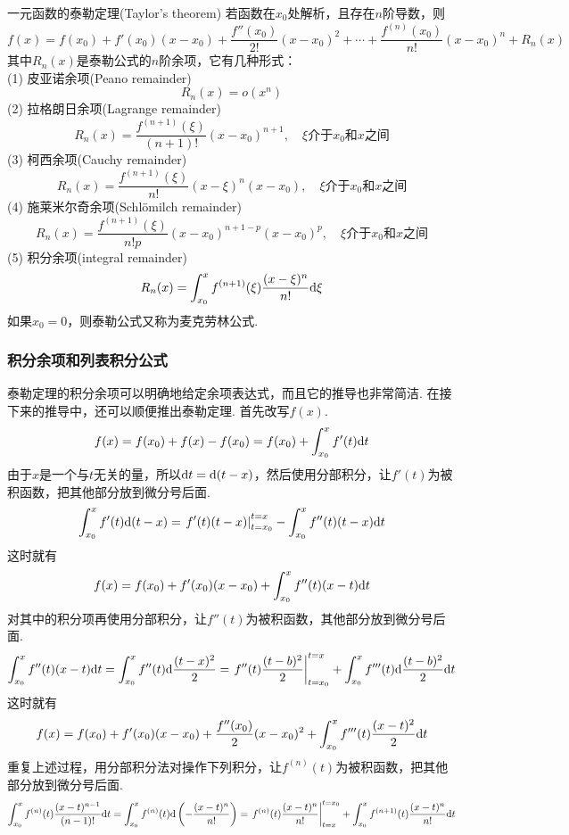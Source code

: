 \begin{theorem}{一元函数的泰勒定理(Taylor's theorem)}
    若函数在\(x_0\)处解析，且存在\(n\)阶导数，则
    \[f(x) = f(x_0)+f'(x_0)(x-x_0)+\frac{f''(x_0)}{2!}(x-x_0)^2+\cdots+\frac{f^{(n)}(x_0)}{n!}(x-x_0)^n+R_n(x)\]
    其中\(R_n(x)\)是泰勒公式的\(n\)阶余项，它有几种形式：\\
    (1) 皮亚诺余项(Peano remainder)
    \[ R_n(x) = o(x^n) \]
    (2) 拉格朗日余项(Lagrange remainder)
    \[ R_n(x) = \frac{f^{(n+1)}(\xi)}{(n+1)!}(x-x_0)^{n+1}, \quad \xi\mbox{介于}x_0\mbox{和}x\mbox{之间}\]
    (3) 柯西余项(Cauchy remainder)
    \[ R_n(x) = \frac{f^{(n+1)}(\xi)}{n!}(x-\xi)^{n}(x-x_0), \quad \xi\mbox{介于}x_0\mbox{和}x\mbox{之间}\]
    (4) 施莱米尔奇余项(Schlömilch remainder)
    \[ R_n(x) = \frac{f^{(n+1)}(\xi)}{n!p}(x-x_0)^{n+1-p}(x-x_0)^p, \quad \xi\mbox{介于}x_0\mbox{和}x\mbox{之间}\]
    (5) 积分余项(integral remainder)
    \[ R_n(x) = \int_{x_0}^{x}f^{(n+1)}(\xi)\frac{(x-\xi)^{n}}{n!}{\rm d}{\xi} \]
    如果\(x_0=0\)，则泰勒公式又称为麦克劳林公式.
\end{theorem}

\subsubsection{积分余项和列表积分公式}

泰勒定理的积分余项可以明确地给定余项表达式，而且它的推导也非常简洁. 在接下来的推导中，还可以顺便推出泰勒定理. 首先改写\(f(x)\).
\[f(x)=f(x_0)+f(x)-f(x_0)=f(x_0)+\int_{x_0}^{x}f'(t){\rm d}t\]
由于\(x\)是一个与\(t\)无关的量，所以\({\rm d}t={\rm d}(t-x)\)，然后使用分部积分，让\(f'(t)\)为被积函数，把其他部分放到微分号后面.
\[\int_{x_0}^{x}f'(t){\rm d}(t-x) = \left.f'(t)(t-x)\right|_{t=x_0}^{t=x} - \int_{x_0}^{x}f''(t)(t-x){\rm d}t\]
这时就有
\[f(x) = f(x_0)+f'(x_0)(x-x_0)+\int_{x_0}^{x}f''(t)(x-t){\rm d}t\]
对其中的积分项再使用分部积分，让\(f''(t)\)为被积函数，其他部分放到微分号后面.
\[\int_{x_0}^{x}f''(t)(x-t){\rm d}t = \int_{x_0}^{x}f''(t){\rm d}\frac{(t-x)^2}{2} = \left.f''(t)\frac{(t-b)^2}{2}\right|_{t=x_0}^{t=x} + \int_{x_0}^{x}f'''(t){\rm d}\frac{(t-b)^2}{2}{\rm d}t\]
这时就有
\[f(x) = f(x_0)+f'(x_0)(x-x_0)+\frac{f''(x_0)}{2}(x-x_0)^2+\int_{x_0}^{x}f'''(t)\frac{(x-t)^2}{2}{\rm d}t\]
重复上述过程，用分部积分法对操作下列积分，让\(f^{(n)}(t)\)为被积函数，把其他部分放到微分号后面.
\[\int_{x_0}^{x}f^{(n)}(t)\frac{(x-t)^{n-1}}{(n-1)!}{\rm d}t = \int_{x_0}^{x}f^{(n)}(t){\rm d}\left(-\frac{(x-t)^n}{n!}\right) = \left.f^{(n)}(t)\frac{(x-t)^n}{n!}\right|_{t=x}^{t=x_0} + \int_{x_0}^{x}f^{(n+1)}(t)\frac{(x-t)^{n}}{n!}{\rm d}t\]

